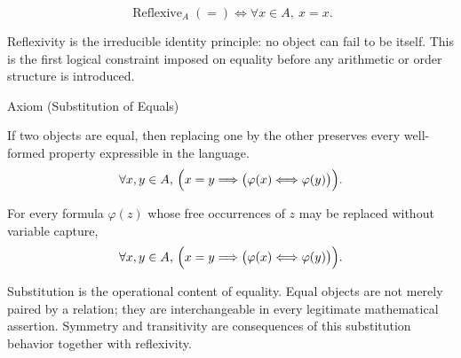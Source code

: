 \begin{remark*}
\[
\operatorname{Reflexive}_A(=)
\Longleftrightarrow
\forall x \in A,\ x=x.
\]
\end{remark*}

\begin{remark*}[Interpretation]
Reflexivity is the irreducible identity principle: no object can fail to be
itself. This is the first logical constraint imposed on equality before any
arithmetic or order structure is introduced.
\end{remark*}

\NoLocalDependencies

\begin{axiombox}{Axiom (Substitution of Equals)}
\begin{axiom}
\label{ax:equality-substitution}
If two objects are equal, then replacing one by the other preserves every
well-formed property expressible in the language.
\[
\forall x,y \in A,\,
\Bigl(x=y \Longrightarrow
\bigl(\varphi(x) \Longleftrightarrow \varphi(y)\bigr)\Bigr).
\]
\end{axiom}
\end{axiombox}

\begin{remark*}
For every formula $\varphi(z)$ whose free occurrences of $z$ may be replaced
without variable capture,
\[
\forall x,y \in A,\,
\Bigl(x=y \Longrightarrow
\bigl(\varphi(x) \Longleftrightarrow \varphi(y)\bigr)\Bigr).
\]
\end{remark*}

\begin{remark*}[Interpretation]
Substitution is the operational content of equality. Equal objects are not
merely paired by a relation; they are interchangeable in every legitimate
mathematical assertion. Symmetry and transitivity are consequences of this
substitution behavior together with reflexivity.
\end{remark*}

\NoLocalDependencies

